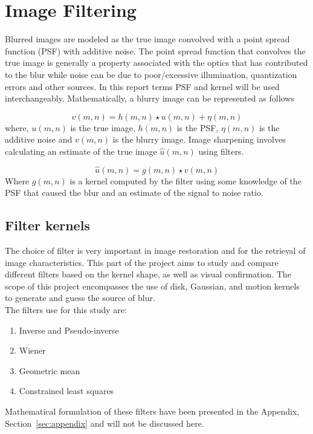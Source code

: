 \graphicspath{{mehul_pics/}}%

\section{Image Filtering}

Blurred images are modeled as the true image convolved with a point spread function (PSF) with additive noise. The point spread function that convolves the true image is generally a property associated with the optics that has contributed to the blur while noise can be due to poor/excessive illumination, quantization errors and other sources. In this report terms PSF and kernel will be used interchangeably. Mathematically, a blurry image can be represented as follows

\begin{equation}
v(m,n)= h(m,n) \star u(m,n) + \eta(m,n)
\end{equation}
where, $u(m,n)$ is the true image, $h(m,n)$ is the PSF, $\eta(m,n)$ is the additive noise and $v(m,n)$ is the blurry image. Image sharpening involves calculating an estimate of the true image $\hat{u}(m,n)$ using filters.

\begin{equation}
\hat{u}(m,n)= g(m,n) \star v(m,n)
\end{equation}
Where $g(m,n)$ is a kernel computed by the filter using some knowledge of the PSF that caused the blur and an estimate of the signal to noise ratio.

\subsection{Filter kernels}
The choice of filter is very important in image restoration and for the retrieval of image characteristics. This part of the project aims to study and compare different filters based on the kernel shape, as well as visual confirmation. The scope of this project encompasses the use of disk, Gaussian, and motion kernels to generate and guess the source of blur.\\

The filters use for this study are: 
\begin{enumerate}
\item Inverse and Pseudo-inverse
\item Wiener
\item Geometric mean
\item Constrained least squares
\end{enumerate} 
Mathematical formulation of these filters have been presented in the Appendix, Section~\ref{sec:appendix} and will not be discussed here. 

